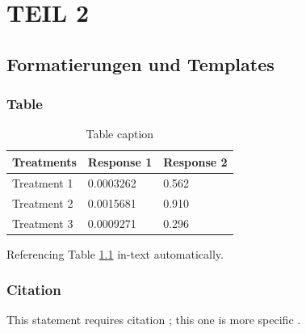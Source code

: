 \documentclass[11pt,fleqn]{book} %
\begin{document}
 

\part{TEIL 2}


\chapter{Formatierungen und Templates}

\section{Table}

\begin{table}[h]
\centering
\begin{tabular}{l l l}
\toprule
\textbf{Treatments} & \textbf{Response 1} & \textbf{Response 2}\\
\midrule
Treatment 1 & 0.0003262 & 0.562 \\
Treatment 2 & 0.0015681 & 0.910 \\
Treatment 3 & 0.0009271 & 0.296 \\
\bottomrule
\end{tabular}
\caption{Table caption}
\label{tab:example} %
\end{table}

Referencing Table \ref{tab:example} in-text automatically.



\section{Citation}

This statement requires citation \cite{article_key}; this one is more specific \cite[162]{book_key}.

\end{document}
